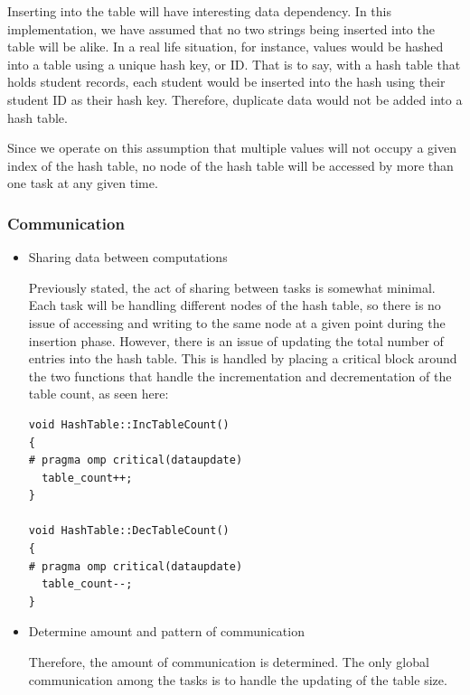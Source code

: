 \documentclass{article}
\begin{document}
\begin{itemize}
            Inserting into the table will have interesting data dependency. In this implementation, we have assumed that no two 
            strings being inserted into the table will be alike. In a real life situation, for instance, values would be hashed into 
            a table using a unique hash key, or ID. That is to say, with a hash table that holds student records, each student would 
            be inserted into the hash using their student ID as their hash key. Therefore, duplicate data would not be added into a 
            hash table. 
            
            Since we operate on this assumption that multiple values will not occupy a given index of the hash table, no node of the 
            hash table will be accessed by more than one task at any given time.
        \end{itemize}
\subsubsection{Communication}
        \begin{itemize}
            \item Sharing data between computations
            
            Previously stated, the act of sharing between tasks is somewhat minimal. Each task will be handling different nodes of the 
            hash table, so there is no issue of accessing and writing to the same node at a given point during the insertion phase. 
            However, there is an issue of updating the total number of entries into the hash table. This is handled by placing a 
            critical block around the two functions that handle the incrementation and decrementation of the table count, as seen here: 
	    \begin{lstlisting}
void HashTable::IncTableCount()
{
# pragma omp critical(dataupdate)
  table_count++;
}

void HashTable::DecTableCount()
{
# pragma omp critical(dataupdate)
  table_count--;
}
	    \end{lstlisting}
	    
            \item Determine amount and pattern of communication
            
            Therefore, the amount of communication is determined. The only global communication among the tasks is to handle the updating of 
            the table size.
        \end{itemize}
\end{document}
